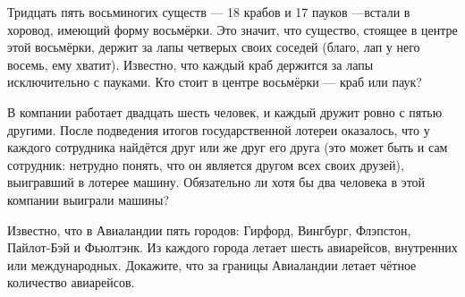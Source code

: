﻿
\begin{enumerate}
\itA Тридцать пять восьминогих существ — 18 крабов и 17 пауков —\linebreak встали в хоровод, имеющий форму восьмёрки. Это значит, что существо, стоящее в центре этой восьмёрки, держит за лапы четверых своих соседей (благо, лап у него восемь, ему хватит). Известно, что каждый краб держится за лапы исключительно с пауками. Кто стоит в центре восьмёрки --- краб или паук?

\itB В компании работает двадцать шесть человек, и каждый дружит ровно с пятью другими. После подведения итогов государственной лотереи оказалось, что у каждого сотрудника найдётся друг или же друг его друга (это может быть и сам сотрудник: нетрудно понять, что он является другом всех своих друзей), выигравший в лотерее машину. Обязательно ли хотя бы два человека в этой компании выиграли машины?

\itC Известно, что в Авиаландии пять городов: Гирфорд, Вингбург, Флэпстон, Пайлот-Бэй и Фьюлтэнк. Из каждого города летает шесть авиарейсов, внутренних или международных. Докажите, что за границы Авиаландии летает чётное количество авиарейсов.
\end{enumerate}